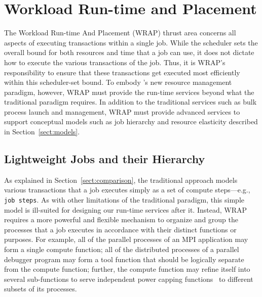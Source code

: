 \section{Workload Run-time and Placement} 
\label{sect:WRAP}

\ifcomments
{}
\fi
The Workload Run-time And Placement (WRAP) thrust area concerns all aspects of
executing transactions within a single job. 
While the scheduler sets the overall bound for both resources and time that a job 
can use, it does not dictate how to execute the various transactions of the job.
Thus, it is WRAP's responsibility to ensure that these transactions get executed 
most efficiently within this scheduler-set bound.
To embody \ngrm's new resource management paradigm, however, WRAP must provide the run-time
services beyond what the traditional paradigm requires. 
In addition to the traditional services such as bulk process launch and 
management, WRAP must provide advanced services to 
support conceptual models such as job hierarchy and resource elasticity 
described in Section~\ref{sect:models}.

\subsection{Lightweight Jobs and their Hierarchy}

\ifcomments
{}
As explained in Section~\ref{sect:comparison}, the traditional
approach models various transactions that a job executes simply as a set of
compute steps---e.g., {\tt job steps}.
As with other limitations of the traditional paradigm, this simple model
is ill-suited for designing our run-time services after it. 
Instead, WRAP requires a more powerful and flexible mechanism
to organize and group the processes that a job executes 
in accordance with their distinct functions or purposes. 
For example, all of the parallel processes of an MPI application may form a single 
compute function; all of the distributed processes of a parallel
debugger program may form a tool function that should be logically separate from 
the compute function; further, the compute function
may refine itself into several sub-functions to serve
independent power capping functions~\cite{RountreeRAPL} to different subsets of its processes.  

